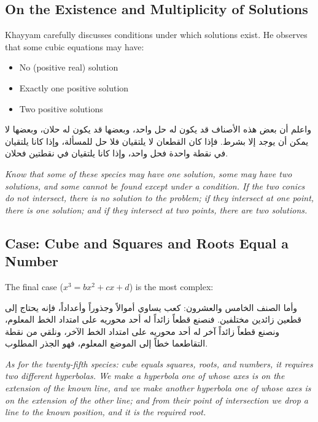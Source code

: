 \subsection{On the Existence and Multiplicity of Solutions}

\label{subsec:existence}
Khayyam carefully discusses conditions under which solutions exist. He observes that some cubic equations may have:

\begin{itemize}
[noitemsep]
\item No (positive real) solution
\item Exactly one positive solution
\item Two positive solutions

\end{itemize}

\begin{Arabic}
واعلم أن بعض هذه الأصناف قد يكون له حل واحد، وبعضها قد يكون له حلان، وبعضها لا يمكن أن يوجد إلا بشرط. فإذا كان القطعان لا يلتقيان فلا حل للمسألة، وإذا كانا يلتقيان في نقطة واحدة فحل واحد، وإذا كانا يلتقيان في نقطتين فحلان.

\end{Arabic}

\textit{Know that some of these species may have one solution, some may have two solutions, and some cannot be found except under a condition.
If the two conics do not intersect, there is no solution to the problem;
 if they intersect at one point, there is one solution;
 and if they intersect at two points, there are two solutions.}

\subsection{Case: Cube and Squares and Roots Equal a Number}

\label{subsec:case25}
The final case ($x^3 = b x^2 + c x + d$) is the most complex:

\begin{Arabic}
وأما الصنف الخامس والعشرون: كعب يساوي أموالاً وجذوراً وأعداداً، فإنه يحتاج إلى قطعين زائدين مختلفين. فنصنع قطعاً زائداً له أحد محوريه على امتداد الخط المعلوم، ونصنع قطعاً زائداً آخر له أحد محوريه على امتداد الخط الآخر، ونلقي من نقطة التقاطعما خطاً إلى الموضع المعلوم، فهو الجذر المطلوب.

\end{Arabic}

\textit{As for the twenty-fifth species: cube equals squares, roots, and numbers, it requires two different hyperbolas. We make a hyperbola one of whose axes is on the extension of the known line, and we make another hyperbola one of whose axes is on the extension of the other line;
 and from their point of intersection we drop a line to the known position, and it is the required root.}
\clearpage

